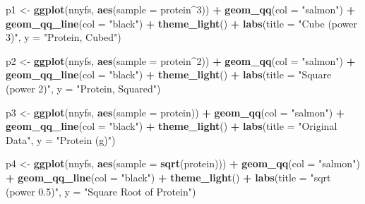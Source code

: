 \documentclass[
]{book}
\newenvironment{Shaded}{\begin{snugshade}}{\end{snugshade}}
\newcommand{\DataTypeTok}[1]{\textcolor[rgb]{0.13,0.29,0.53}{#1}}
\newcommand{\DecValTok}[1]{\textcolor[rgb]{0.00,0.00,0.81}{#1}}
\newcommand{\KeywordTok}[1]{\textcolor[rgb]{0.13,0.29,0.53}{\textbf{#1}}}
\newcommand{\NormalTok}[1]{#1}
\newcommand{\OperatorTok}[1]{\textcolor[rgb]{0.81,0.36,0.00}{\textbf{#1}}}
\newcommand{\StringTok}[1]{\textcolor[rgb]{0.31,0.60,0.02}{#1}}
\begin{document}
\begin{Shaded}
\begin{Highlighting}[]
\NormalTok{p1 <-}\StringTok{ }\KeywordTok{ggplot}\NormalTok{(nnyfs, }\KeywordTok{aes}\NormalTok{(}\DataTypeTok{sample =}\NormalTok{ protein}\OperatorTok{^}\DecValTok{3}\NormalTok{)) }\OperatorTok{+}
\StringTok{    }\KeywordTok{geom_qq}\NormalTok{(}\DataTypeTok{col =} \StringTok{"salmon"}\NormalTok{) }\OperatorTok{+}\StringTok{ }
\StringTok{    }\KeywordTok{geom_qq_line}\NormalTok{(}\DataTypeTok{col =} \StringTok{"black"}\NormalTok{) }\OperatorTok{+}
\StringTok{    }\KeywordTok{theme_light}\NormalTok{() }\OperatorTok{+}
\StringTok{    }\KeywordTok{labs}\NormalTok{(}\DataTypeTok{title =} \StringTok{"Cube (power 3)"}\NormalTok{,}
         \DataTypeTok{y =} \StringTok{"Protein, Cubed"}\NormalTok{)}

\NormalTok{p2 <-}\StringTok{ }\KeywordTok{ggplot}\NormalTok{(nnyfs, }\KeywordTok{aes}\NormalTok{(}\DataTypeTok{sample =}\NormalTok{ protein}\OperatorTok{^}\DecValTok{2}\NormalTok{)) }\OperatorTok{+}
\StringTok{    }\KeywordTok{geom_qq}\NormalTok{(}\DataTypeTok{col =} \StringTok{"salmon"}\NormalTok{) }\OperatorTok{+}\StringTok{ }
\StringTok{    }\KeywordTok{geom_qq_line}\NormalTok{(}\DataTypeTok{col =} \StringTok{"black"}\NormalTok{) }\OperatorTok{+}
\StringTok{    }\KeywordTok{theme_light}\NormalTok{() }\OperatorTok{+}
\StringTok{    }\KeywordTok{labs}\NormalTok{(}\DataTypeTok{title =} \StringTok{"Square (power 2)"}\NormalTok{,}
         \DataTypeTok{y =} \StringTok{"Protein, Squared"}\NormalTok{)}

\NormalTok{p3 <-}\StringTok{ }\KeywordTok{ggplot}\NormalTok{(nnyfs, }\KeywordTok{aes}\NormalTok{(}\DataTypeTok{sample =}\NormalTok{ protein)) }\OperatorTok{+}
\StringTok{    }\KeywordTok{geom_qq}\NormalTok{(}\DataTypeTok{col =} \StringTok{"salmon"}\NormalTok{) }\OperatorTok{+}\StringTok{ }
\StringTok{    }\KeywordTok{geom_qq_line}\NormalTok{(}\DataTypeTok{col =} \StringTok{"black"}\NormalTok{) }\OperatorTok{+}
\StringTok{    }\KeywordTok{theme_light}\NormalTok{() }\OperatorTok{+}
\StringTok{    }\KeywordTok{labs}\NormalTok{(}\DataTypeTok{title =} \StringTok{"Original Data"}\NormalTok{,}
         \DataTypeTok{y =} \StringTok{"Protein (g)"}\NormalTok{)}


\NormalTok{p4 <-}\StringTok{ }\KeywordTok{ggplot}\NormalTok{(nnyfs, }\KeywordTok{aes}\NormalTok{(}\DataTypeTok{sample =} \KeywordTok{sqrt}\NormalTok{(protein))) }\OperatorTok{+}
\StringTok{    }\KeywordTok{geom_qq}\NormalTok{(}\DataTypeTok{col =} \StringTok{"salmon"}\NormalTok{) }\OperatorTok{+}\StringTok{ }
\StringTok{    }\KeywordTok{geom_qq_line}\NormalTok{(}\DataTypeTok{col =} \StringTok{"black"}\NormalTok{) }\OperatorTok{+}
\StringTok{    }\KeywordTok{theme_light}\NormalTok{() }\OperatorTok{+}
\StringTok{    }\KeywordTok{labs}\NormalTok{(}\DataTypeTok{title =} \StringTok{"sqrt (power 0.5)"}\NormalTok{,}
         \DataTypeTok{y =} \StringTok{"Square Root of Protein"}\NormalTok{)}


\end{Highlighting}
\end{Shaded}
\end{document}
